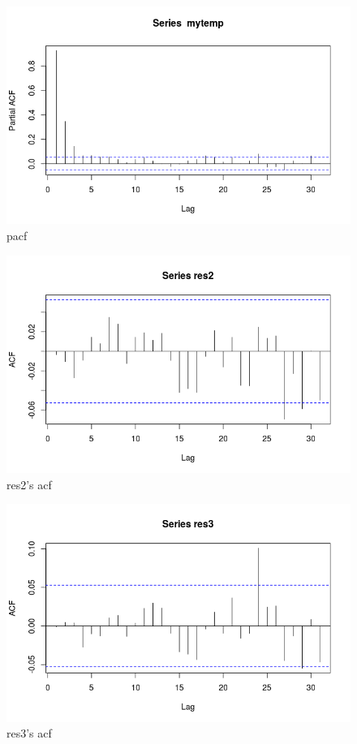 \documentclass[a4paper,11pt]{article}
\begin{document}
\begin{figure}[H]
\centering
\caption{pacf}
\includegraphics[scale=.70]{mytemp_pacf.png}
\end{figure}


\begin{figure}[H]
\centering
\caption{res2's acf}
\includegraphics[scale=.70]{res2_acf.png}
\end{figure}

\begin{figure}[H]
\centering
\caption{res3's acf}
\includegraphics[scale=.70]{res3_acf.png}
\end{figure}
\end{document}
